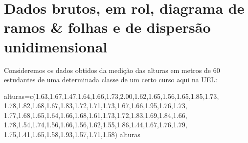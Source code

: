 \documentclass[
]{book}
\newenvironment{Shaded}{\begin{snugshade}}{\end{snugshade}}
\newcommand{\FloatTok}[1]{\textcolor[rgb]{0.00,0.00,0.81}{#1}}
\newcommand{\FunctionTok}[1]{\textcolor[rgb]{0.00,0.00,0.00}{#1}}
\newcommand{\NormalTok}[1]{#1}
\newcommand{\OtherTok}[1]{\textcolor[rgb]{0.56,0.35,0.01}{#1}}
\begin{document}
\hypertarget{dados-brutos-em-rol-diagrama-de-ramos-folhas-e-de-dispersuxe3o-unidimensional}{%
\section{Dados brutos, em rol, diagrama de ramos \& folhas e de dispersão unidimensional}\label{dados-brutos-em-rol-diagrama-de-ramos-folhas-e-de-dispersuxe3o-unidimensional}}

Consideremos os dados obtidos da medição das alturas em metros de 60 estudantes de uma determinada classe de um certo curso aqui na UEL:

\begin{Shaded}
\begin{Highlighting}[]
\NormalTok{alturas}\OtherTok{=}\FunctionTok{c}\NormalTok{(}\FloatTok{1.63}\NormalTok{,}\FloatTok{1.67}\NormalTok{,}\FloatTok{1.47}\NormalTok{,}\FloatTok{1.64}\NormalTok{,}\FloatTok{1.66}\NormalTok{,}\FloatTok{1.73}\NormalTok{,}\FloatTok{2.00}\NormalTok{,}\FloatTok{1.62}\NormalTok{,}\FloatTok{1.65}\NormalTok{,}\FloatTok{1.56}\NormalTok{,}\FloatTok{1.65}\NormalTok{,}\FloatTok{1.85}\NormalTok{,}\FloatTok{1.73}\NormalTok{,}
          \FloatTok{1.78}\NormalTok{,}\FloatTok{1.82}\NormalTok{,}\FloatTok{1.68}\NormalTok{,}\FloatTok{1.67}\NormalTok{,}\FloatTok{1.83}\NormalTok{,}\FloatTok{1.72}\NormalTok{,}\FloatTok{1.71}\NormalTok{,}\FloatTok{1.73}\NormalTok{,}\FloatTok{1.67}\NormalTok{,}\FloatTok{1.66}\NormalTok{,}\FloatTok{1.95}\NormalTok{,}\FloatTok{1.76}\NormalTok{,}\FloatTok{1.73}\NormalTok{,}
          \FloatTok{1.77}\NormalTok{,}\FloatTok{1.68}\NormalTok{,}\FloatTok{1.65}\NormalTok{,}\FloatTok{1.64}\NormalTok{,}\FloatTok{1.66}\NormalTok{,}\FloatTok{1.68}\NormalTok{,}\FloatTok{1.61}\NormalTok{,}\FloatTok{1.73}\NormalTok{,}\FloatTok{1.72}\NormalTok{,}\FloatTok{1.83}\NormalTok{,}\FloatTok{1.69}\NormalTok{,}\FloatTok{1.84}\NormalTok{,}\FloatTok{1.66}\NormalTok{,}
          \FloatTok{1.78}\NormalTok{,}\FloatTok{1.54}\NormalTok{,}\FloatTok{1.74}\NormalTok{,}\FloatTok{1.56}\NormalTok{,}\FloatTok{1.66}\NormalTok{,}\FloatTok{1.56}\NormalTok{,}\FloatTok{1.62}\NormalTok{,}\FloatTok{1.55}\NormalTok{,}\FloatTok{1.86}\NormalTok{,}\FloatTok{1.44}\NormalTok{,}\FloatTok{1.67}\NormalTok{,}\FloatTok{1.76}\NormalTok{,}\FloatTok{1.79}\NormalTok{,}
          \FloatTok{1.75}\NormalTok{,}\FloatTok{1.41}\NormalTok{,}\FloatTok{1.65}\NormalTok{,}\FloatTok{1.58}\NormalTok{,}\FloatTok{1.93}\NormalTok{,}\FloatTok{1.57}\NormalTok{,}\FloatTok{1.71}\NormalTok{,}\FloatTok{1.58}\NormalTok{)}
\NormalTok{alturas}
\end{Highlighting}
\end{Shaded}
\end{document}
